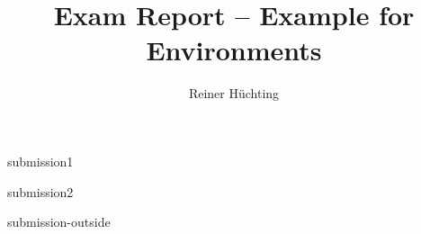 \documentclass[a4paper]{scrartcl}
\begin{document}
    \title{Exam Report -- Example for Environments}
    \author{Reiner Hüchting}

    \maketitle

    \begin{examreport}[../submissions]
        \begin{submissionreport}{submission1}
        \end{submissionreport}
        \begin{submissionreport}{submission2}
        \end{submissionreport}
    \end{examreport}

    \begin{submissionreport}{submission-outside}
    \end{submissionreport}
\end{document}
